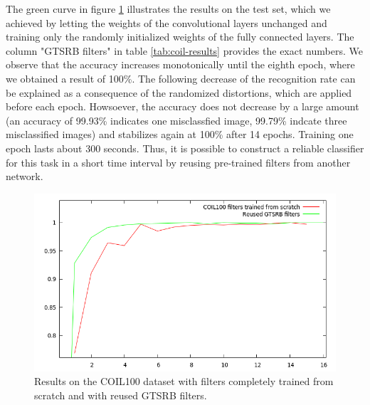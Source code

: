 \documentclass[11pt, a4paper]{article}
\begin{document}
The green curve in figure \ref{fig:coil100_results} illustrates the results on the test set, which we achieved by letting the weights of the convolutional layers unchanged and training only the randomly initialized weights of the fully connected layers. The column "GTSRB filters" in table \ref{tab:coil-results} provides the exact numbers. We observe that the accuracy increases monotonically until the eighth epoch, where we obtained a result of 100\%. The following decrease of the recognition rate can be explained as a consequence of the randomized distortions, which are applied before each epoch. Howsoever, the accuracy does not decrease by a large amount (an accuracy of 99.93\% indicates one misclassfied image, 99.79\% indcate three misclassified images) and stabilizes again at 100\% after 14 epochs. Training one epoch lasts about 300 seconds. Thus, it is possible to construct a reliable classifier for this task in a short time interval by reusing pre-trained filters from another network.%
\begin{figure}[h!]
	\centering
	\includegraphics[width=1\textwidth]{coil100_results.png}
	\caption{Results on the COIL100 dataset with filters completely trained from scratch and with reused GTSRB filters.}
	\label{fig:coil100_results}
\end{figure}
\end{document}
